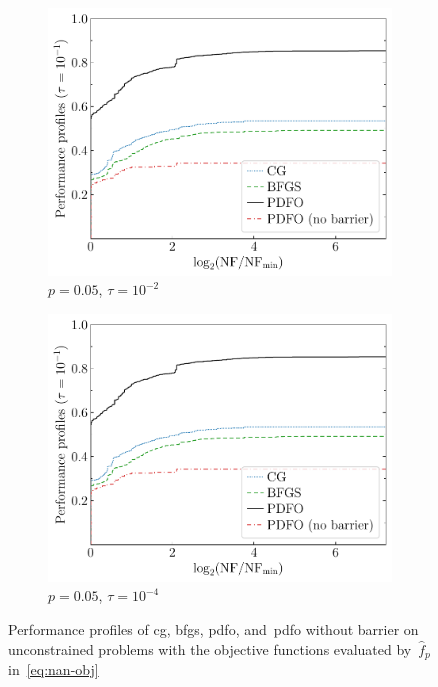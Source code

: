\documentclass[manuscript,screen,review]{acmart}
\numberwithin{equation}{section}
\newcommand*{\obj}{f}
\begin{document}
\begin{figure}[htbp]
\begin{subfigure}{.48\textwidth}
        \centering
        \includegraphics[width=\textwidth,page=2]{perf-nan-bfgs_cg_pdfo-50-10-0.05.pdf}
        \caption{$p = 0.05$, $\tau = 10^{-2}$}
    \end{subfigure}
    \hfill
    \begin{subfigure}{.48\textwidth}
        \centering
        \includegraphics[width=\textwidth,page=4]{perf-nan-bfgs_cg_pdfo-50-10-0.05.pdf}
        \caption{$p = 0.05$, $\tau = 10^{-4}$}
    \end{subfigure}
    \caption{Performance profiles of \gls{cg}, \gls{bfgs}, \gls{pdfo}, and~\gls{pdfo} without
        barrier on unconstrained problems
    with the objective functions evaluated by~$\hat{\obj}_p$ in~\eqref{eq:nan-obj}}
    \label{fig:nan}
\end{figure}
\end{document}
